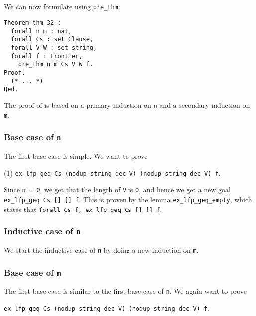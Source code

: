 \subsection{}

We can now formulate  using \lstinline{pre_thm}:

\begin{minipage}{\linewidth}
\begin{lstlisting}[language=Coq, label={lst:thm_32}, caption={\Cref{thm:3.2} in Coq}]
Theorem thm_32 :
  forall n m : nat,
  forall Cs : set Clause,
  forall V W : set string,
  forall f : Frontier,
    pre_thm n m Cs V W f.
Proof.
  (* ... *)
Qed.
\end{lstlisting}
\end{minipage}

The proof of  is based on a primary induction on \lstinline{n} and a secondary induction on \lstinline{m}.

\subsubsection{Base case of \lstinline{n}}

The first base case is simple. We want to prove

(1) \tabto{2em}
\lstinline{ex_lfp_geq Cs (nodup string_dec V) (nodup string_dec V) f}.

Since \lstinline{n = 0}, we get that the length of \lstinline{V} is \lstinline{0},
and hence we get a new goal \lstinline{ex_lfp_geq Cs [] [] f}.
This is proven by the lemma \lstinline{ex_lfp_geq_empty},
which states that \lstinline{forall Cs f, ex_lfp_geq Cs [] [] f}.

\subsubsection{Inductive case of \lstinline{n}}

We start the inductive case of \lstinline{n} by doing a new induction on \lstinline{m}.

\subsubsection{Base case of \lstinline{m}}

The first base case is similar to the first base case of \lstinline{n}.
We again want to prove

\tabto{2em}
\lstinline{ex_lfp_geq Cs (nodup string_dec V) (nodup string_dec V) f}.

